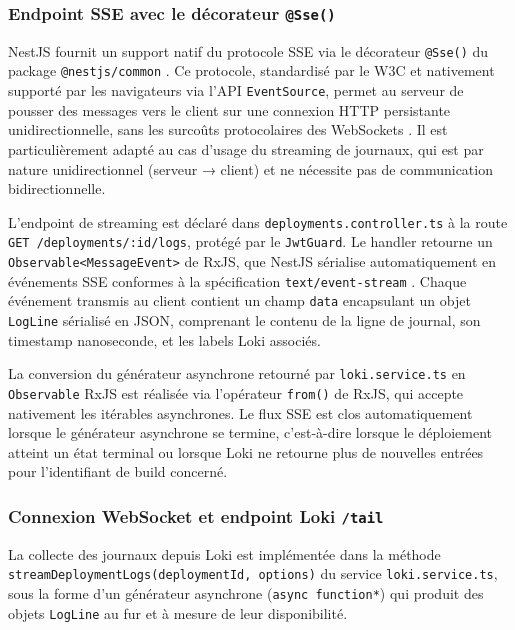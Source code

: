 \subsubsection*{Endpoint SSE avec le décorateur \texttt{@Sse()}}

NestJS fournit un support natif du protocole SSE via le décorateur \texttt{@Sse()} du package \texttt{@nestjs/common} \cite{nestjs-sse}. Ce protocole, standardisé par le W3C et nativement supporté par les navigateurs via l'API \texttt{EventSource}, permet au serveur de pousser des messages vers le client sur une connexion HTTP persistante unidirectionnelle, sans les surcoûts protocolaires des WebSockets \cite{nestjs-sse-guide}. Il est particulièrement adapté au cas d'usage du streaming de journaux, qui est par nature unidirectionnel (serveur → client) et ne nécessite pas de communication bidirectionnelle.

L'endpoint de streaming est déclaré dans \texttt{deployments.controller.ts} à la route \texttt{GET /deployments/:id/logs}, protégé par le \texttt{JwtGuard}. Le handler retourne un \texttt{Observable<MessageEvent>} de RxJS, que NestJS sérialise automatiquement en événements SSE conformes à la spécification \texttt{text/event-stream} \cite{nestjs-sse}. Chaque événement transmis au client contient un champ \texttt{data} encapsulant un objet \texttt{LogLine} sérialisé en JSON, comprenant le contenu de la ligne de journal, son timestamp nanoseconde, et les labels Loki associés.

La conversion du générateur asynchrone retourné par \texttt{loki.service.ts} en \texttt{Observable} RxJS est réalisée via l'opérateur \texttt{from()} de RxJS, qui accepte nativement les itérables asynchrones. Le flux SSE est clos automatiquement lorsque le générateur asynchrone se termine, c'est-à-dire lorsque le déploiement atteint un état terminal ou lorsque Loki ne retourne plus de nouvelles entrées pour l'identifiant de build concerné.

\subsubsection*{Connexion WebSocket et endpoint Loki \texttt{/tail}}

La collecte des journaux depuis Loki est implémentée dans la méthode \texttt{streamDeploymentLogs(deploymentId, options)} du service \texttt{loki.service.ts}, sous la forme d'un générateur asynchrone (\texttt{async function*}) qui produit des objets \texttt{LogLine} au fur et à mesure de leur disponibilité.


